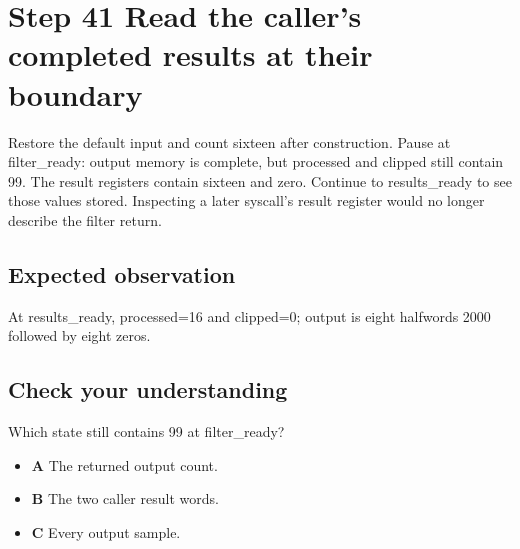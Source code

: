 \section{Step 41 Read the caller’s completed results at their boundary}\label{fir-s41}

Restore the default input and count sixteen after construction. Pause at filter\_ready: output memory is complete, but processed and clipped still contain 99. The result registers contain sixteen and zero. Continue to results\_ready to see those values stored. Inspecting a later syscall’s result register would no longer describe the filter return.

\subsection{Expected observation}
At results\_ready, processed=16 and clipped=0; output is eight halfwords 2000 followed by eight zeros.

\subsection{Check your understanding}
Which state still contains 99 at filter\_ready?

\begin{itemize}
  \item \textbf{A} The returned output count.
  \item \textbf{B} The two caller result words.
  \item \textbf{C} Every output sample.
\end{itemize}
